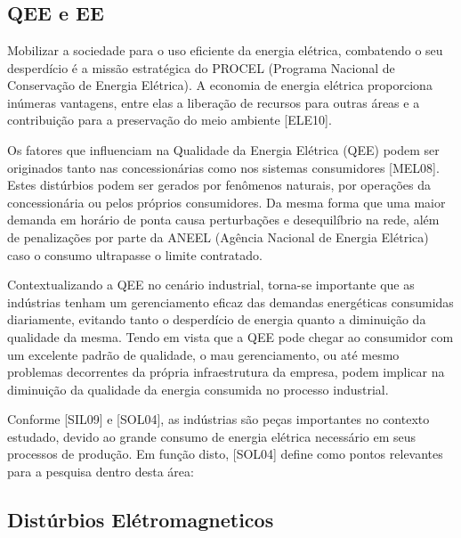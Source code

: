 \chapter{\capdois}\label{qeeDIS}
\section{QEE e EE}\label{qeeEE}
\par 
Mobilizar a sociedade para o uso eficiente da energia elétrica, combatendo o seu desperdício é a missão estratégica do PROCEL (Programa Nacional de Conservação de Energia Elétrica). A economia de energia elétrica proporciona inúmeras vantagens, entre elas a liberação de recursos para outras áreas e a contribuição para a preservação do meio ambiente [ELE10].
\par
Os fatores que influenciam na Qualidade da Energia Elétrica (QEE) podem ser originados tanto nas concessionárias como nos sistemas consumidores [MEL08]. Estes distúrbios podem ser gerados por fenômenos naturais, por operações da concessionária ou pelos próprios consumidores. Da mesma forma que uma maior demanda em horário de ponta causa perturbações e desequilíbrio na rede, além de penalizações por parte da ANEEL (Agência Nacional de Energia Elétrica) caso o consumo ultrapasse o limite contratado. 
\par
Contextualizando a QEE no cenário industrial, torna-se importante que as indústrias tenham um gerenciamento eficaz das demandas energéticas consumidas diariamente, evitando tanto o desperdício de energia quanto a diminuição da qualidade da mesma. Tendo em vista que a QEE pode chegar ao consumidor com um excelente padrão de qualidade, o mau gerenciamento, ou até mesmo problemas decorrentes da própria infraestrutura da empresa, podem implicar na diminuição da qualidade da energia consumida no processo industrial. 
\par
Conforme [SIL09] e [SOL04], as indústrias são peças importantes no contexto estudado, devido ao grande consumo de energia elétrica necessário em seus processos de produção. Em função disto, [SOL04] define como pontos relevantes para a pesquisa dentro desta área:

\section{Distúrbios Elétromagneticos}\label{dis}
